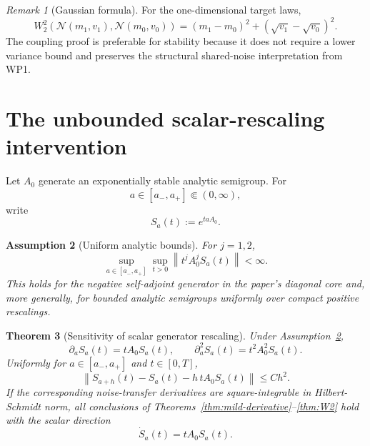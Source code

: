 \documentclass[11pt]{article}
\newtheorem{assumption}{Assumption}[section]
\newtheorem{theorem}[assumption]{Theorem}
\theoremstyle{remark}
\newtheorem{remark}[assumption]{Remark}
\newcommand{\N}{\mathcal N}
\newcommand{\norm}[1]{\left\lVert #1\right\rVert}
\begin{document}
\begin{remark}[Gaussian formula]
For the one-dimensional target laws,
\begin{equation}\label{eq:Gaussian-W2}
 W_2^2(\N(m_1,v_1),\N(m_0,v_0))
 =(m_1-m_0)^2+(\sqrt{v_1}-\sqrt{v_0})^2.
\end{equation}
The coupling proof is preferable for stability because it does not require a lower variance bound and preserves the structural shared-noise interpretation from WP1.
\end{remark}

\section{The unbounded scalar-rescaling intervention}

Let $A_0$ generate an exponentially stable analytic semigroup. For
\begin{equation}\label{eq:a-range}
 a\in[a_-,a_+]\Subset(0,\infty),
\end{equation}
write
\begin{equation}\label{eq:Sa}
 S_a(t):=e^{taA_0}.
\end{equation}

\begin{assumption}[Uniform analytic bounds]\label{ass:analytic}
For $j=1,2$,
\begin{equation}\label{eq:analytic-bound}
 \sup_{a\in[a_-,a_+]}
 \sup_{t>0}
 \norm{t^jA_0^jS_a(t)}<\infty.
\end{equation}
This holds for the negative self-adjoint generator in the paper's diagonal core and, more generally, for bounded analytic semigroups uniformly over compact positive rescalings.
\end{assumption}

\begin{theorem}[Sensitivity of scalar generator rescaling]\label{thm:scalar-scaling}
Under Assumption~\ref{ass:analytic},
\begin{equation}\label{eq:scalar-derivatives}
 \partial_aS_a(t)=tA_0S_a(t),
 \qquad
 \partial_a^2S_a(t)=t^2A_0^2S_a(t).
\end{equation}
Uniformly for $a\in[a_-,a_+]$ and $t\in[0,T]$,
\begin{equation}\label{eq:scalar-rem}
 \norm{S_{a+h}(t)-S_a(t)-h\,tA_0S_a(t)}
 \le Ch^2.
\end{equation}
If the corresponding noise-transfer derivatives are square-integrable in Hilbert-Schmidt norm, all conclusions of Theorems~\ref{thm:mild-derivative}--\ref{thm:W2} hold with the scalar direction
\begin{equation}\label{eq:dotSa}
 \dot S_a(t)=tA_0S_a(t).
\end{equation}
\end{theorem}
\end{document}
